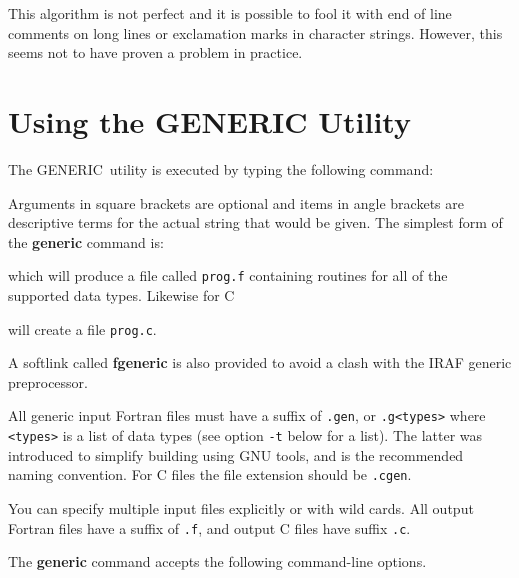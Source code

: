 \documentclass[twoside,11pt,nolof]{starlink}
\providecommand{\GENERIC}{{\footnotesize GENERIC}\normalsize}
\begin{document}
This algorithm is not perfect and it is possible to fool it with end
of line comments on long lines or exclamation marks in character
strings.  However, this seems not to have proven a problem in practice.

\section{Using the GENERIC Utility}

The \GENERIC\ utility is executed by typing the following command:

\begin{terminalv}
           file1 [file2...]}
\end{terminalv}

Arguments in square brackets are optional and items in angle brackets are
descriptive terms for the actual string that would be given.  The simplest form
of the \textbf{generic} command is:

\begin{terminalv}
\end{terminalv}

which will produce a file called \texttt{prog.f} containing routines for
all of the supported data types.  Likewise for C

\begin{terminalv}
\end{terminalv}
will create a file \texttt{prog.c}.

A softlink called \textbf{fgeneric} is also provided to avoid a clash
with the IRAF generic preprocessor.

All generic input Fortran files must have a suffix of \texttt{.gen}, or
\texttt{.g}\verb+<types>+ where \verb+<types>+ is a list of data types
(see option \texttt{-t} below for a list).  The latter was introduced to
simplify building using GNU tools, and is the recommended naming
convention.  For C files the file extension should be \texttt{.cgen}.

You can specify multiple input files explicitly or with wild cards.
All output Fortran files have a suffix of \texttt{.f}, and output C files
have suffix \texttt{.c}.

The \textbf{generic} command accepts the following command-line options.
\end{document}
